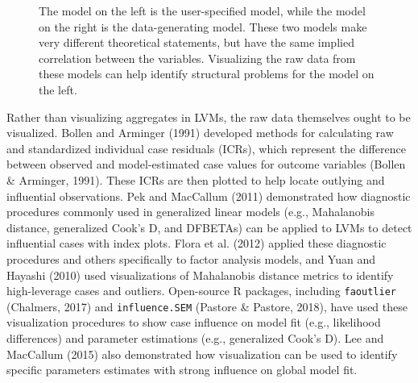 \documentclass[
  english,
  doc]{apa6}
\begin{document}
\begin{figure}
\begin{center}
\caption{The model on the left is the user-specified model, while the model on the right is the data-generating model. These two models make very different theoretical statements, but have the same implied correlation between the variables. Visualizing the raw data from these models can help identify structural problems for the model on the left.}
\label{fig:implied}
\end{center}
\end{figure}

Rather than visualizing aggregates in LVMs, the raw data themselves ought to be visualized. Bollen and Arminger (1991) developed methods for calculating raw and standardized individual case residuals (ICRs), which represent the difference between observed and model-estimated case values for outcome variables (Bollen \& Arminger, 1991). These ICRs are then plotted to help locate outlying and influential observations. Pek and MacCallum (2011) demonstrated how diagnostic procedures commonly used in generalized linear models (e.g., Mahalanobis distance, generalized Cook's D, and DFBETAs) can be applied to LVMs to detect influential cases with index plots. Flora et al. (2012) applied these diagnostic procedures and others specifically to factor analysis models, and Yuan and Hayashi (2010) used visualizations of Mahalanobis distance metrics to identify high-leverage cases and outliers. Open-source R packages, including \texttt{faoutlier} (Chalmers, 2017) and \texttt{influence.SEM} (Pastore \& Pastore, 2018), have used these visualization procedures to show case influence on model fit (e.g., likelihood differences) and parameter estimations (e.g., generalized Cook's D). Lee and MacCallum (2015) also demonstrated how visualization can be used to identify specific parameters estimates with strong influence on global model fit.
\end{document}
